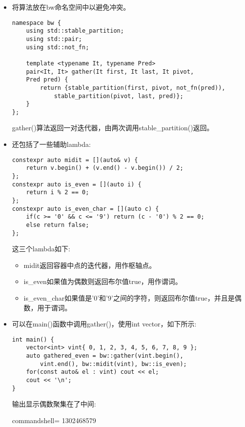 \begin{itemize}
\item 
将算法放在bw命名空间中以避免冲突。

\begin{lstlisting}[style=styleCXX]
namespace bw {
	using std::stable_partition;
	using std::pair;
	using std::not_fn;
	
	template <typename It, typename Pred>
	pair<It, It> gather(It first, It last, It pivot,
	Pred pred) {
		return {stable_partition(first, pivot, not_fn(pred)),
			stable_partition(pivot, last, pred)};
	}
};
\end{lstlisting}

gather()算法返回一对迭代器，由两次调用stable\_partition()返回。

\item 
还包括了一些辅助lambda:

\begin{lstlisting}[style=styleCXX]
constexpr auto midit = [](auto& v) {
	return v.begin() + (v.end() - v.begin()) / 2;
};
constexpr auto is_even = [](auto i) {
	return i % 2 == 0;
};
constexpr auto is_even_char = [](auto c) {
	if(c >= '0' && c <= '9') return (c - '0') % 2 == 0;
	else return false;
};
\end{lstlisting}

这三个lambda如下:

\begin{itemize}
\item 
midit返回容器中点的迭代器，用作枢轴点。

\item 
is\_even如果值为偶数则返回布尔值true，用作谓词。

\item 
is\_even\_char如果值是'0'和'9'之间的字符，则返回布尔值true，并且是偶数，用于谓词。
\end{itemize}

\item 
可以在main()函数中调用gather()，使用int vector，如下所示:

\begin{lstlisting}[style=styleCXX]
int main() {
	vector<int> vint{ 0, 1, 2, 3, 4, 5, 6, 7, 8, 9 };
	auto gathered_even = bw::gather(vint.begin(),
		vint.end(), bw::midit(vint), bw::is_even);
	for(const auto& el : vint) cout << el;
	cout << '\n';
}
\end{lstlisting}

输出显示偶数聚集在了中间:

\begin{tcblisting}{commandshell={}}
1302468579
\end{tcblisting}


\end{itemize}
